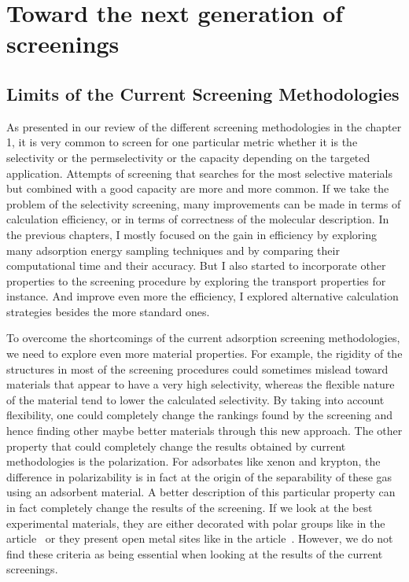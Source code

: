 \documentclass[main]{subfiles}
\begin{document}
\chapter{Toward the next generation of screenings}
\vspace*{-1\baselineskip}

\section{Limits of the Current Screening Methodologies}

As presented in our review of the different screening methodologies in the chapter 1, it is very common to screen for one particular metric whether it is the selectivity or the permselectivity or the capacity depending on the targeted application. Attempts of screening that searches for the most selective materials but combined with a good capacity are more and more common.\autocite{Chung_2019,Zhang_2022,Solanki_2020} If we take the problem of the selectivity screening, many improvements can be made in terms of calculation efficiency, or in terms of correctness of the molecular description. In the previous chapters, I mostly focused on the gain in efficiency by exploring many adsorption energy sampling techniques and by comparing their computational time  and their accuracy. But I also started to incorporate other properties to the screening procedure by exploring the transport properties for instance. And improve even more the efficiency, I explored alternative calculation strategies besides the more standard ones. 

To overcome the shortcomings of the current adsorption screening methodologies, we need to explore even more material properties. For example, the rigidity of the structures in most of the screening procedures could sometimes mislead toward materials that appear to have a very high selectivity, whereas the flexible nature of the material tend to lower the calculated selectivity. By taking into account flexibility, one could completely change the rankings found by the screening and hence finding other maybe better materials through this new approach. The other property that could completely change the results obtained by current methodologies is the polarization. For adsorbates like xenon and krypton, the difference in polarizability is in fact at the origin of the separability of these gas using an adsorbent material. A better description of this particular property can in fact completely change the results of the screening. If we look at the best experimental materials, they are either decorated with polar groups like in the article~\cite{Li_2019} or they present open metal sites like in the article~\cite{Pei_2022}. However, we do not find these criteria as being essential when looking at the results of the current screenings. 
\end{document}
